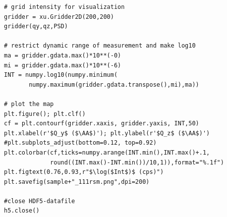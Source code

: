 \begin{lstlisting}[caption={reading a spec-file, saving it to HDF5, reading a particular scan, convert it to reciprocal space, plot it using matplotlib}]
# grid intensity for visualization
gridder = xu.Gridder2D(200,200)
gridder(qy,qz,PSD)

# restrict dynamic range of measurement and make log10
ma = gridder.gdata.max()*10**(-0)
mi = gridder.gdata.max()*10**(-6)
INT = numpy.log10(numpy.minimum(
       numpy.maximum(gridder.gdata.transpose(),mi),ma))

# plot the map
plt.figure(); plt.clf()
cf = plt.contourf(gridder.xaxis, gridder.yaxis, INT,50)
plt.xlabel(r'$Q_y$ ($\AA$)'); plt.ylabel(r'$Q_z$ ($\AA$)')
#plt.subplots_adjust(bottom=0.12, top=0.92)
plt.colorbar(cf,ticks=numpy.arange(INT.min(),INT.max()+.1,
             round((INT.max()-INT.min())/10,1)),format="%.1f")
plt.figtext(0.76,0.93,r"$\log($Int$)$ (cps)")
plt.savefig(sample+"_111rsm.png",dpi=200)

#close HDF5-datafile
h5.close()
\end{lstlisting}
